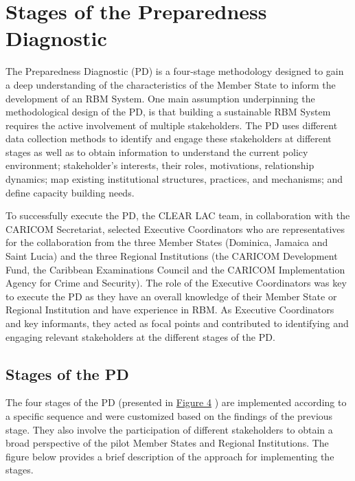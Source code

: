 \documentclass[
  10pt,
]{book}
\begin{document}
\hypertarget{stages-of-the-preparedness-diagnostic}{%
\section{Stages of the Preparedness Diagnostic}\label{stages-of-the-preparedness-diagnostic}}

The Preparedness Diagnostic (PD) is a four-stage methodology designed to gain a deep understanding of the characteristics of the Member State to inform the development of an RBM System. One main assumption underpinning the methodological design of the PD, is that building a sustainable RBM System requires the active involvement of multiple stakeholders. The PD uses different data collection methods to identify and engage these stakeholders at different stages as well as to obtain information to understand the current policy environment; stakeholder's interests, their roles, motivations, relationship dynamics; map existing institutional structures, practices, and mechanisms; and define capacity building needs.

To successfully execute the PD, the CLEAR LAC team, in collaboration with the CARICOM Secretariat, selected Executive Coordinators who are representatives for the collaboration from the three Member States (Dominica, Jamaica and Saint Lucia) and the three Regional Institutions (the CARICOM Development Fund, the Caribbean Examinations Council and the CARICOM Implementation Agency for Crime and Security). The role of the Executive Coordinators was key to execute the PD as they have an overall knowledge of their Member State or Regional Institution and have experience in RBM. As Executive Coordinators and key informants, they acted as focal points and contributed to identifying and engaging relevant stakeholders at the different stages of the PD.

\hypertarget{stages-of-the-pd}{%
\subsection*{Stages of the PD}\label{stages-of-the-pd}}

The four stages of the PD (presented in \protect\hyperlink{fig:figure4}{Figure 4} ) are implemented according to a specific sequence and were customized based on the findings of the previous stage. They also involve the participation of different stakeholders to obtain a broad perspective of the pilot Member States and Regional Institutions. The figure below provides a brief description of the approach for implementing the stages.
\end{document}
